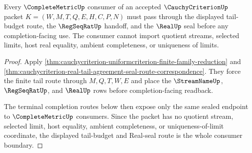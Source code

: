 \begin{theorem}
\label{thm:cauchycriterion-complete-metric-consumer-boundary}
Every $\CompleteMetricUp$ consumer of an accepted $\CauchyCriterionUp$ packet
$K=(W,M,T,Q,E,H,C,P,N)$ must pass through the displayed tail-budget route, the
$\RegSeqRatUp$ handoff, and the $\RealUp$ seal before any completion-facing use.
The consumer cannot import quotient streams, selected limits, host real
equality, ambient completeness, or uniqueness of limits.
\end{theorem}
\begin{proof}
Apply \autoref{thm:cauchycriterion-uniformcriterion-finite-family-reduction}
and \autoref{thm:cauchycriterion-real-tail-agreement-seal-route-correspondence}.
They force the finite tail route through $M,Q,T,W,E$ and place the
$\StreamNameUp$, $\RegSeqRatUp$, and $\RealUp$ rows before completion-facing
readback.

The terminal completion routes below then expose only the same sealed endpoint
to $\CompleteMetricUp$ consumers. Since the packet has no quotient stream,
selected limit, host equality, ambient completeness, or uniqueness-of-limit
coordinate, the displayed tail-budget and Real-seal route is the whole
consumer boundary.
\end{proof}

